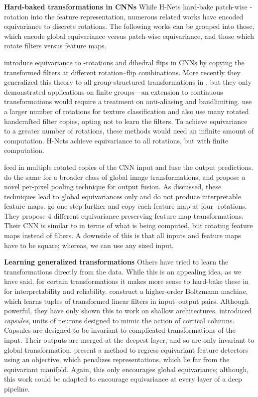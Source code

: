 \documentclass[10pt,twocolumn,letterpaper]{article}
\begin{document}
\textbf{Hard-baked transformations in CNNs}
While H-Nets hard-bake patch-wise -rotation into the feature 
representation, numerous related works have encoded equivariance to 
discrete rotations. The following works can be grouped into those,
which encode global equivariance versus patch-wise equivariance, and 
those which rotate filters versus feature maps.

\cite{cohen2016group} introduce equivariance to -rotations and dihedral flips in CNNs by copying the transformed filters at different rotation--flip combinations. More recently they generalized this theory to all group-structured transformations in \cite{cohen2016steer}, but they only demonstrated applications on finite groups---an extension to continuous transformations would require a treatment on anti-aliasing and bandlimiting. \cite{marcos2016learning} use a larger number of rotations for texture classification and \cite{oyallon2015scattering} also use many rotated handcrafted filter copies, opting not to learn the filters. To achieve equivariance to a greater number of rotations, these methods would need an infinite amount of computation. H-Nets achieve equivariance to all rotations, but with finite computation. 

\cite{fasel2006neocognitron} feed in multiple rotated copies of the CNN input and fuse the output predictions. \cite{laptev2016tipooling} do the same for a broader class of global image transformations, and propose a novel per-pixel pooling technique for output fusion. As discussed, these techniques lead to global equivariances only and do not produce interpretable feature maps. \cite{dieleman2016exploiting} go one step further and copy each feature map at four -rotations. They propose 4 different equivariance preserving feature map transformations. Their CNN is similar to \cite{cohen2016group} in terms of what is being computed, but rotating feature maps instead of filters. A downside of this is that all inputs and feature maps have to be square; whereas, we can use any sized input.

\textbf{Learning generalized transformations}
Others have tried to learn the transformations directly from the data. While this is an appealing idea, as we have said, for certain transformations it makes more sense to hard-bake these in for interpretability and reliability. \cite{memisevic2010hobm} construct a higher-order Boltzmann machine, which learns tuples of transformed linear filters in input--output pairs. Although powerful, they have only shown this to work on shallow architectures. \cite{hinton2011transforming} introduced \emph{capsules}, units of neurons designed to mimic the action of cortical columns. Capsules are designed to be invariant to complicated transformations of the input. Their outputs are merged at the deepest layer, and so are only invariant to global transformation. \cite{lenc2016covariant} present a method to regress equivariant feature detectors using an objective, which penalizes representations, which lie far from the equivariant manifold. Again, this only encourages global equivariance; although, this work could be adapted to encourage equivariance at every layer of a deep pipeline.
\end{document}
